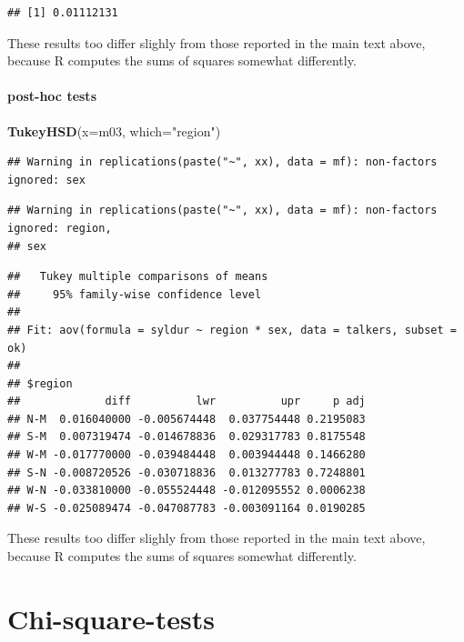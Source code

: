 \documentclass[
]{book}
\newenvironment{Shaded}{\begin{snugshade}}{\end{snugshade}}
\newcommand{\DataTypeTok}[1]{\textcolor[rgb]{0.13,0.29,0.53}{#1}}
\newcommand{\KeywordTok}[1]{\textcolor[rgb]{0.13,0.29,0.53}{\textbf{#1}}}
\newcommand{\NormalTok}[1]{#1}
\newcommand{\StringTok}[1]{\textcolor[rgb]{0.31,0.60,0.02}{#1}}
\begin{document}
\begin{verbatim}
## [1] 0.01112131
\end{verbatim}

These results too differ slighly from those reported in the main text above, because R computes the sums of squares somewhat differently.

\hypertarget{post-hoc-tests}{%
\subsubsection{post-hoc tests}\label{post-hoc-tests}}

\begin{Shaded}
\begin{Highlighting}[]
\KeywordTok{TukeyHSD}\NormalTok{(}\DataTypeTok{x=}\NormalTok{m03, }\DataTypeTok{which=}\StringTok{"region"}\NormalTok{)}
\end{Highlighting}
\end{Shaded}

\begin{verbatim}
## Warning in replications(paste("~", xx), data = mf): non-factors ignored: sex
\end{verbatim}

\begin{verbatim}
## Warning in replications(paste("~", xx), data = mf): non-factors ignored: region,
## sex
\end{verbatim}

\begin{verbatim}
##   Tukey multiple comparisons of means
##     95% family-wise confidence level
## 
## Fit: aov(formula = syldur ~ region * sex, data = talkers, subset = ok)
## 
## $region
##             diff          lwr          upr     p adj
## N-M  0.016040000 -0.005674448  0.037754448 0.2195083
## S-M  0.007319474 -0.014678836  0.029317783 0.8175548
## W-M -0.017770000 -0.039484448  0.003944448 0.1466280
## S-N -0.008720526 -0.030718836  0.013277783 0.7248801
## W-N -0.033810000 -0.055524448 -0.012095552 0.0006238
## W-S -0.025089474 -0.047087783 -0.003091164 0.0190285
\end{verbatim}

These results too differ slighly from those reported in the main text above, because R computes the sums of squares somewhat differently.

\hypertarget{ch:chi-square-tests}{%
\chapter{Chi-square-tests}\label{ch:chi-square-tests}}
\end{document}
